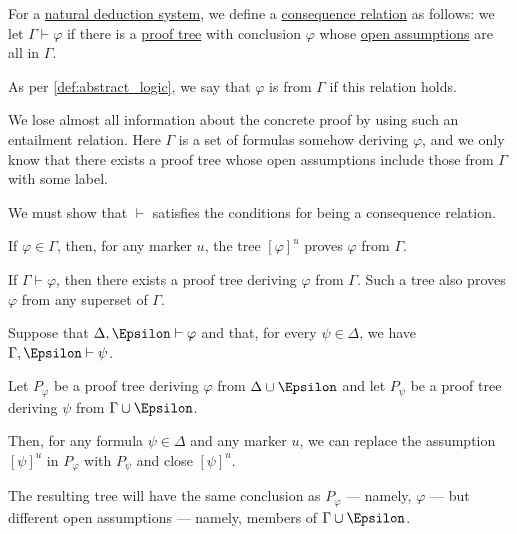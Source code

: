 \begin{definition}\label{def:natural_deduction_entailment}
  For a \hyperref[def:abstract_natural_deduction_system]{natural deduction system}, we define a \hyperref[def:consequence_relation]{consequence relation} as follows: we let \( \Gamma \vdash \varphi \) if there is a \hyperref[def:propositional_natural_deduction_proof_tree]{proof tree} with conclusion \( \varphi \) whose \hyperref[def:propositional_natural_deduction_proof_tree/open]{open assumptions} are all in \( \Gamma \).

  As per \cref{def:abstract_logic}, we say that \( \varphi \) is  from \( \Gamma \) if this relation holds.
\end{definition}
\begin{comments}
  \item We lose almost all information about the concrete proof by using such an entailment relation. Here \( \Gamma \) is a set of formulas somehow deriving \( \varphi \), and we only know that there exists a proof tree whose open assumptions include those from \( \Gamma \) with some label.
\end{comments}
\begin{defproof}
  We must show that \( {\vdash} \) satisfies the conditions for being a consequence relation.

   If \( \varphi \in \Gamma \), then, for any marker \( u \), the tree \( [\varphi]^u \) proves \( \varphi \) from \( \Gamma \).

   If \( \Gamma \vdash \varphi \), then there exists a proof tree deriving \( \varphi \) from \( \Gamma \). Such a tree also proves \( \varphi \) from any superset of \( \Gamma \).

   Suppose that \( \Delta, \Epsilon \vdash \varphi \) and that, for every \( \psi \in \Delta \), we have \( \Gamma, \Epsilon \vdash \psi \).

  Let \( P_\varphi \) be a proof tree deriving \( \varphi \) from \( \Delta \cup \Epsilon \) and let \( P_\psi \) be a proof tree deriving \( \psi \) from \( \Gamma \cup \Epsilon \).

  Then, for any formula \( \psi \in \Delta \) and any marker \( u \), we can replace the assumption \( [\psi]^u \) in \( P_\varphi \) with \( P_\psi \) and close \( [\psi]^u \).

  The resulting tree will have the same conclusion as \( P_\varphi \) --- namely, \( \varphi \) --- but different open assumptions --- namely, members of \( \Gamma \cup \Epsilon \).
\end{defproof}

